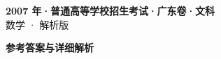 \documentclass[zihao=-4, a4paper]{ctexart}
\begin{document}
\begin{center}
  {\Large\bfseries 2007 年·普通高等学校招生考试·广东卷·文科}\\[4pt]
  {\large 数学 · 解析版}
\end{center}
\medskip
{}

\clearpage
{}
\begin{center}{\Large\bfseries 参考答案与详细解析}\end{center}
\medskip

\end{document}
